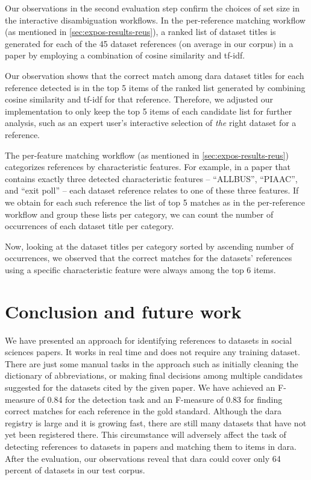 \documentclass{IOS-Book-Article}
\newcommand{\dara}{\textsf{da\textbar ra}}
\begin{document}
Our observations in the second evaluation step confirm the choices of set size in the interactive disambiguation workflows. In the per-reference matching workflow (as mentioned in \ref{sec:expos-results-reus}), a ranked list of dataset titles is generated for each of the 45 dataset references (on average in our corpus) in a paper by employing a combination of cosine similarity and tf-idf. 
 
Our observation shows that the correct match among {\dara} dataset titles for each reference detected is in the top 5 items of the ranked list generated by combining cosine similarity and tf-idf for that reference. Therefore, we adjusted our implementation to only keep the top 5 items of each candidate list for further analysis, such as an expert user's interactive selection of \emph{the} right dataset for a reference.
 
The per-feature matching workflow (as mentioned in \ref{sec:expos-results-reus}) categorizes references by characteristic features. For example, in a paper that contains exactly three detected characteristic features -- \enquote{ALLBUS}, \enquote{PIAAC}, and \enquote{exit poll} -- each dataset reference relates to one of these three features. If we obtain for each such reference the list of top 5 matches as in the per-reference workflow and group these lists per category, we can count the number of occurrences of each dataset title per category. 
 
Now, looking at the dataset titles per category sorted by ascending number of occurrences, we observed that the correct matches for the datasets' references using a specific characteristic feature were always among the top 6 items.
 
\section{Conclusion and future work}
\label{sec:future}
We have presented an approach for identifying references to datasets in social sciences papers.
It works in real time and does not require any training dataset.
There are just some manual tasks in the approach such as initially cleaning the dictionary of abbreviations, or making final decisions among multiple candidates suggested for the datasets cited by the given paper.
We have achieved an F-measure of 0.84 for the detection task and an F-measure of 0.83 for finding correct matches for each reference in the gold standard.  
Although the {\dara} registry is large and it is growing fast, there are still many datasets that have not yet been registered there. 
This circumstance will adversely affect the task of detecting references to datasets in papers and matching them to items in {\dara}.
After the evaluation, our observations reveal that {\dara} could cover only 64 percent of datasets in our test corpus. 
\end{document}
